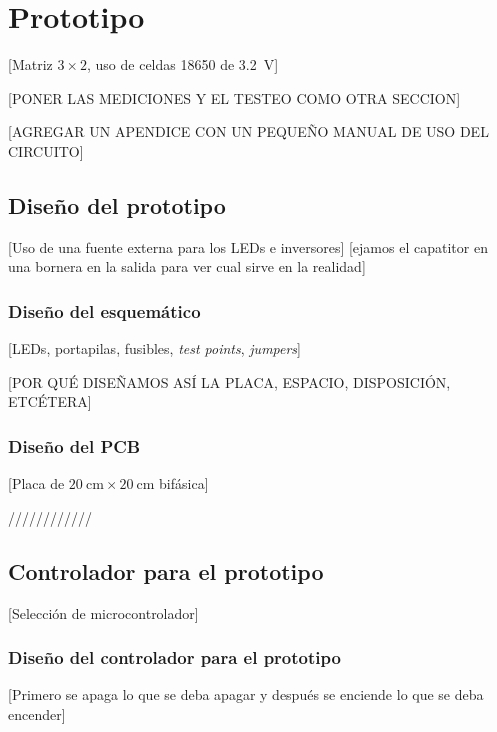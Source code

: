 \section{Prototipo}

[Matriz $3\times2$, uso de celdas 18650 de \SI{3.2}{\volt}]

[PONER LAS MEDICIONES Y EL TESTEO COMO OTRA SECCION]

[AGREGAR UN APENDICE CON UN PEQUEÑO MANUAL DE USO DEL CIRCUITO]

\subsection{Diseño del prototipo}

[Uso de una fuente externa para los LEDs e inversores]
[ejamos el capatitor en una bornera en la salida para  ver cual sirve en la realidad]

\subsubsection{Diseño del esquemático}

[LEDs, portapilas, fusibles, \textit{test points}, \textit{jumpers}]

[POR QUÉ DISEÑAMOS ASÍ LA PLACA, ESPACIO, DISPOSICIÓN, ETCÉTERA]

\subsubsection{Diseño del PCB}

[Placa de $\SI{20}{\centi\meter}\times\SI{20}{\centi\meter}$ bifásica]





////////////


\subsection{Controlador para el prototipo}

[Selección de microcontrolador]



\subsubsection{Diseño del controlador para el prototipo}

[Primero se apaga lo que se deba apagar y después se enciende lo que se deba encender]
 
